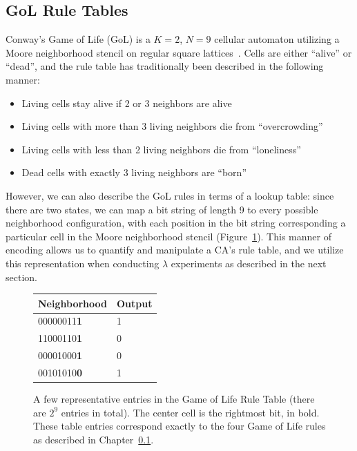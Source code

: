 \documentclass[a4paper,11pt]{report}
\begin{document}
\subsection{GoL Rule Tables}
\label{ch3:subsec_gol}
Conway's Game of Life (GoL) is a $K=2$, $N=9$ cellular automaton utilizing a Moore neighborhood stencil on regular square lattices~\cite{ga70}. Cells are either ``alive'' or ``dead'', and the rule table has traditionally been described in the following manner:

\begin{itemize}
\item Living cells stay alive if 2 or 3 neighbors are alive
\item Living cells with more than 3 living neighbors die from ``overcrowding''
\item Living cells with less than 2 living neighbors die from ``loneliness''
\item Dead cells with exactly 3 living neighbors are ``born''
\end{itemize}

However, we can also describe the GoL rules in terms of a lookup table: since there are two states, we can map a bit string of length 9 to every possible neighborhood configuration, with each position in the bit string corresponding a particular cell in the Moore neighborhood stencil (Figure~\ref{fig:gol_table}). This manner of encoding allows us to quantify and manipulate a CA's rule table, and we utilize this representation when conducting $\lambda$ experiments as described in the next section.

\begin{figure}[htp]
\centering
\begin{tabular}{| l | l |}
\hline
Neighborhood & Output \\
\hline
00000011\textbf{1} & 1 \\
\hline
11000110\textbf{1} & 0 \\
\hline
00001000\textbf{1} & 0 \\
\hline
00101010\textbf{0} & 1 \\
\hline
\end{tabular}
\caption[Game of Life Rule Table]{
	A few representative entries in the Game of Life Rule Table (there are $2^9$ entries in total). The center cell is the rightmost bit, in bold. These table entries correspond exactly to the four Game of Life rules as described in Chapter~\ref{ch3:subsec_gol}.
}
\label{fig:gol_table}
\end{figure}
\end{document}
